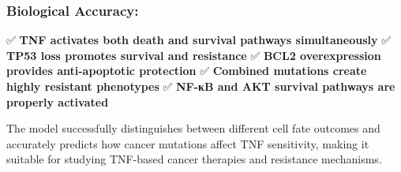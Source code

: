\hypertarget{biological-accuracy}{%
\subsubsection{\texorpdfstring{\textbf{Biological
Accuracy:}}{Biological Accuracy:}}\label{biological-accuracy}}

✅ \textbf{TNF activates both death and survival pathways simultaneously}
✅ \textbf{TP53 loss promotes survival and resistance} ✅ \textbf{BCL2
overexpression provides anti-apoptotic protection} ✅ \textbf{Combined
mutations create highly resistant phenotypes} ✅ \textbf{NF-κB and AKT
survival pathways are properly activated}

The model successfully distinguishes between different cell fate
outcomes and accurately predicts how cancer mutations affect TNF
sensitivity, making it suitable for studying TNF-based cancer therapies
and resistance mechanisms.
